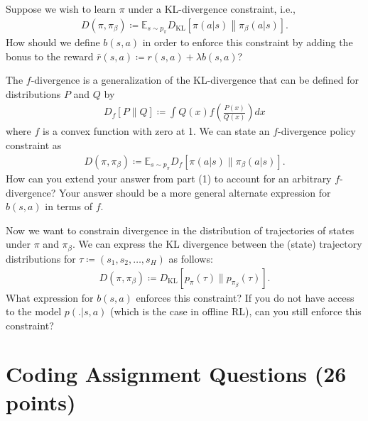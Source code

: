 \documentclass[letterpaper,12pt,addpoints]{exam}
\begin{document}
\begin{questions}

\question[5] Suppose we wish to learn $\pi$ under a KL-divergence constraint, i.e.,
\begin{align*}
D(\pi, \pi_\beta) \coloneqq \mathbb{E}_{s \sim p_\pi} D_{\text{KL}} \left[ \pi\left(a | s\right) \middle\| \pi_\beta\left(a | s\right) \right].
\end{align*}
How should we define $b(s,a)$ in order to enforce this constraint by adding the bonus  to the reward $\bar{r}(s,a) \coloneqq r(s,a) + \lambda b(s,a)$?



\question[5] The $f$-divergence is a generalization of the KL-divergence that can be defined for distributions $P$ and $Q$ by
    \begin{align*}
    D_f [P \| Q] \coloneqq \int Q(x) f \left( \frac{P(x)}{Q(x)} \right) dx
    \end{align*}
    where $f$ is a convex function with zero at 1. We can state an $f$-divergence policy constraint as
    \begin{align*}
    D(\pi, \pi_\beta) \coloneqq \mathbb{E}_{s \sim p_\pi} D_f \left[ \pi(a | s) \| \pi_\beta(a | s) \right].
    \end{align*}
    How can you extend your answer from part (1) to account for an arbitrary $f$-divergence? Your answer should be a more general alternate expression for $b(s,a)$ in terms of $f$.




\question[8] Now we want to constrain divergence in the distribution of trajectories
    of states under $\pi$ and $\pi_\beta$. We can express the KL divergence between the (state) trajectory distributions
    for $\tau \coloneqq (s_1, s_2, \dots, s_H)$ as follows:
    \begin{align*}
    D(\pi, \pi_\beta) \coloneqq D_{\text{KL}} [p_\pi(\tau) \| p_{\pi_\beta}(\tau)].
    \end{align*}
    What expression for $b(s,a)$ enforces this constraint? If you do not have access to the model $p(. | s, a)$ (which is the case in offline RL), can you still enforce this constraint?


\end{questions}

\section{Coding Assignment Questions (26 points)}
\label{sec:coding}
\end{document}
